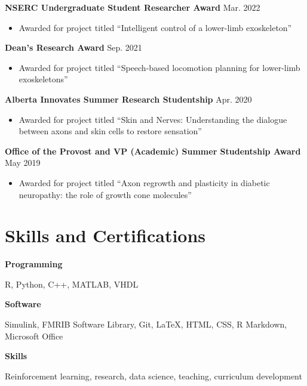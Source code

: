 \documentclass{article}
\begin{document}
\textbf{NSERC Undergraduate Student Researcher Award} \hfill Mar. 2022
\begin{itemize}
    \item Awarded for project titled ``Intelligent control of a lower-limb exoskeleton''
\end{itemize} \vspace{1em}

\textbf{Dean's Research Award} \hfill Sep. 2021
\begin{itemize}
    \item Awarded for project titled ``Speech-based locomotion planning for lower-limb exoskeletons''
\end{itemize} \vspace{1em}

\textbf{Alberta Innovates Summer Research Studentship} \hfill Apr. 2020
\begin{itemize}
    \item Awarded for project titled ``Skin and Nerves: Understanding the dialogue between axons and skin cells to restore sensation''
\end{itemize} \vspace{1em}

\textbf{Office of the Provost and VP (Academic) Summer Studentship Award} \hfill May 2019
\begin{itemize}
    \item Awarded for project titled ``Axon regrowth and plasticity in diabetic neuropathy: the role of growth cone molecules''
\end{itemize}


\section*{\textcolor{my_colour}{Skills and Certifications}}
\vspace{-.25em} \hrulefill \vspace{.25em}

\textbf{Programming} \hfill \parbox[t]{.8\linewidth}{R, Python, C++, MATLAB, VHDL}

\textbf{Software} \hfill \parbox[t]{0.8\linewidth}{Simulink, FMRIB Software Library, Git, \LaTeX, HTML, CSS, R Markdown, Microsoft Office}

\textbf{Skills} \hfill \parbox[t]{.8\linewidth}{Reinforcement learning, research, data science, teaching, curriculum development}
\end{document}
